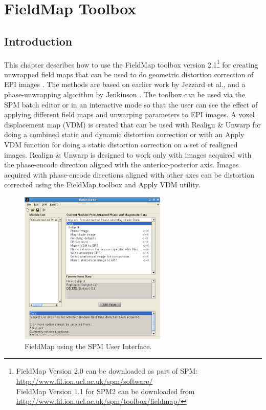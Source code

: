 \chapter{FieldMap Toolbox \label{Chap:FieldMap}}

\section{Introduction}

This chapter describes how to use the FieldMap toolbox version 2.1\footnote{
FieldMap Version 2.0 can be downloaded as part of SPM:
\url{http://www.fil.ion.ucl.ac.uk/spm/software/}\\
FieldMap Version 1.1 for SPM2 can be downloaded from
\url{http://www.fil.ion.ucl.ac.uk/spm/toolbox/fieldmap/}}
 for creating unwrapped field maps that can be used to do geometric distortion correction of EPI images \cite{chloe_distortion,chloe_distortion2,ja_geometric}. The methods are based on earlier work by Jezzard et al.,\cite{jezzard95} and a phase-unwrapping algorithm by Jenkinson \cite{jenkinson03}. The toolbox can be used via the SPM batch editor or in an interactive mode so that the user can see the effect of applying different field maps and unwarping parameters to EPI images. A voxel displacement map (VDM) is created that can be used with Realign \& Unwarp for doing a combined static and dynamic distortion correction or with an Apply VDM function for doing a static distortion correction on a set of realigned images. Realign \& Unwarp is designed to work only with images acquired with the phase-encode direction aligned with the anterior-posterior axis. Images acquired with phase-encode directions aligned with other axes can be distortion corrected using the FieldMap toolbox and Apply VDM utility.

\begin{figure}
\begin{center}
\includegraphics[width=70mm]{FieldMap/fieldmap_taskmgr}
\end{center}
\caption{FieldMap using the SPM User Interface.\label{FM1}}
\end{figure}

